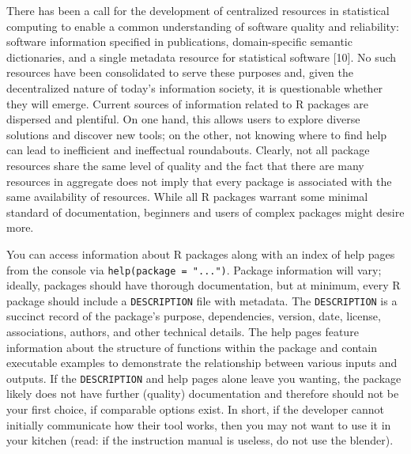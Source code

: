 \documentclass[10pt,letterpaper]{article}
\begin{document}
There has been a call for the development of centralized resources in
statistical computing to enable a common understanding of software
quality and reliability: software information specified in publications,
domain-specific semantic dictionaries, and a single metadata resource
for statistical software {[}10{]}. No such resources have been
consolidated to serve these purposes and, given the decentralized nature
of today's information society, it is questionable whether they will
emerge. Current sources of information related to R packages are
dispersed and plentiful. On one hand, this allows users to explore
diverse solutions and discover new tools; on the other, not knowing
where to find help can lead to inefficient and ineffectual roundabouts.
Clearly, not all package resources share the same level of quality and
the fact that there are many resources in aggregate does not imply that
every package is associated with the same availability of resources.
While all R packages warrant some minimal standard of documentation,
beginners and users of complex packages might desire more.

You can access information about R packages along with an index of help
pages from the console via \texttt{help(package\ =\ "...")}. Package
information will vary; ideally, packages should have thorough
documentation, but at minimum, every R package should include a
\texttt{DESCRIPTION} file with metadata. The \texttt{DESCRIPTION} is a
succinct record of the package's purpose, dependencies, version, date,
license, associations, authors, and other technical details. The help
pages feature information about the structure of functions within the
package and contain executable examples to demonstrate the relationship
between various inputs and outputs. If the \texttt{DESCRIPTION} and help
pages alone leave you wanting, the package likely does not have further
(quality) documentation and therefore should not be your first choice,
if comparable options exist. In short, if the developer cannot initially
communicate how their tool works, then you may not want to use it in
your kitchen (read: if the instruction manual is useless, do not use the
blender).
\end{document}
